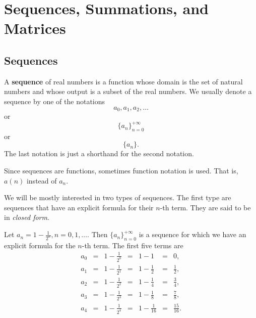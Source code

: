 
\chapter{Sequences, Summations, and Matrices}\label{ch:seqsummat}

\section{Sequences}\label{section:seq}
\begin{df}
A {\bf sequence} of real numbers is a function whose domain is the set of
natural numbers and whose output is a subset of the real numbers. We
usually denote a sequence by one of the notations
$$a_0, a_1, a_2, \ldots 
$$ 
or
$$ \{a_n\}_{n=0} ^{+\infty}  $$
or
$$ \{a_n\}.$$
The last notation is just a shorthand for the second notation.
\end{df}

\begin{rem}
Since sequences are functions, sometimes function notation is used.  That is, $a(n)$
instead of $a_n$.
\end{rem}

We will be mostly interested in two types of sequences. 
The first type are sequences that have an explicit formula for their $n$-th term.
They are said to be in {\em closed form}.

\begin{exa}
Let $a_n = 1 - \frac{1}{2^n}, n = 0, 1, \ldots$. Then $\{a_n\}_{n =
0} ^{+\infty}$ is a sequence for which we have an explicit formula
for the $n$-th term. The first five terms are
$$
\begin{array}{lllllll} 
a_0 & = & 1 -\frac{1}{2^0} &=&1-1 & = & 0, \\[1ex]
 a_1 & = & 1 -\frac{1}{2^1}&=&1-\frac{1}{2} &= & \frac{1}{2}, \\[1ex]
a_2 & = & 1 -\frac{1}{2^2}&=&1-\frac{1}{4} &= & \frac{3}{4}, \\[1ex]
a_3 & = & 1 -\frac{1}{2^3}&=&1-\frac{1}{8} &= & \frac{7}{8}, \\[1ex]
a_4 & = & 1 -\frac{1}{2^4}&=&1-\frac{1}{16} &= & \frac{15}{16}. \\
\end{array}
$$
\end{exa}

